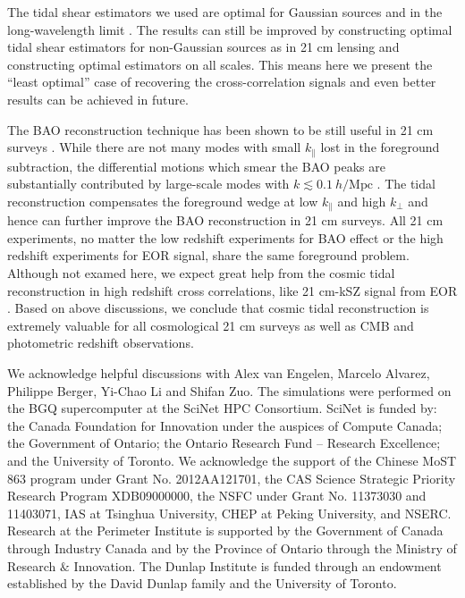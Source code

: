 \documentclass[aps,prl,twocolumn,showpacs,superscriptaddress,groupedaddress,nofootinbib,floatfix]{revtex4}  %
\newcommand{\mr}{\mathrm}
\begin{document}
The tidal shear estimators we used are optimal for Gaussian sources and in the 
long-wavelength limit \cite{2015:zhu}.
The results can still be improved by constructing optimal tidal shear 
estimators for non-Gaussian sources as in 21 cm lensing \cite{2010:lu} and 
constructing optimal estimators on all scales. 
This means here we present the ``least optimal'' case of recovering the 
cross-correlation signals and even better results can be achieved in future.

The BAO reconstruction technique \cite{2007:bao} has been shown to be still
useful in 21 cm surveys \cite{2015:bao1,2015:bao2}. While there are not 
many modes with small $k_\parallel$ lost in the foreground subtraction, the 
differential motions which smear the BAO peaks are substantially contributed
by large-scale modes with $k\lesssim0.1\ h/\mr{Mpc}$ \cite{2007:bao}.
The tidal reconstruction compensates the foreground wedge at low $k_\parallel$
and high $k_\perp$ and hence can further improve the BAO reconstruction in 21 cm
surveys. 
All 21 cm experiments, no matter the low redshift experiments for BAO effect
or the high redshift experiments for EOR signal, share the same foreground 
problem. Although not examed here, we expect great help from the cosmic tidal
reconstruction in high redshift cross correlations, like 21 cm-kSZ signal from 
EOR \cite{2015:marcelo}.
Based on above discussions, we conclude that cosmic tidal reconstruction is 
extremely valuable for all cosmological 21 cm surveys as well as CMB and
photometric redshift observations.

We acknowledge helpful discussions with Alex van Engelen, Marcelo Alvarez,
Philippe Berger, Yi-Chao Li and Shifan Zuo.
The simulations were performed on the BGQ supercomputer 
at the SciNet HPC Consortium.
SciNet is funded by: the Canada Foundation for Innovation under the auspices 
of Compute Canada;
the Government of Ontario; the Ontario Research Fund -- Research Excellence;
and the University of Toronto.
We acknowledge the support of the Chinese MoST 863 program under Grant 
No. 2012AA121701, the CAS Science Strategic Priority Research Program 
XDB09000000, the NSFC under Grant No. 11373030 and 11403071, IAS at 
Tsinghua University, CHEP at Peking University, and NSERC.
Research at the Perimeter Institute is supported by the Government of Canada 
through Industry Canada and by the Province of Ontario through the Ministry of 
Research $\&$ Innovation.
The Dunlap Institute is funded through an endowment established by the David Dunlap family and the University of Toronto.



\end{document}
